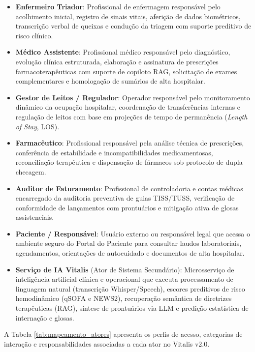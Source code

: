 \begin{itemize}[leftmargin=*]
    \item \textbf{Enfermeiro Triador}: Profissional de enfermagem responsável pelo acolhimento inicial, registro de sinais vitais, aferição de dados biométricos, transcrição verbal de queixas e condução da triagem com suporte preditivo de risco clínico.
    \item \textbf{Médico Assistente}: Profissional médico responsável pelo diagnóstico, evolução clínica estruturada, elaboração e assinatura de prescrições farmacoterapêuticas com suporte de copiloto RAG, solicitação de exames complementares e homologação de sumários de alta hospitalar.
    \item \textbf{Gestor de Leitos / Regulador}: Operador responsável pelo monitoramento dinâmico da ocupação hospitalar, coordenação de transferências internas e regulação de leitos com base em projeções de tempo de permanência (\textit{Length of Stay}, LOS).
    \item \textbf{Farmacêutico}: Profissional responsável pela análise técnica de prescrições, conferência de estabilidade e incompatibilidades medicamentosas, reconciliação terapêutica e dispensação de fármacos sob protocolo de dupla checagem.
    \item \textbf{Auditor de Faturamento}: Profissional de controladoria e contas médicas encarregado da auditoria preventiva de guias TISS/TUSS, verificação de conformidade de lançamentos com prontuários e mitigação ativa de glosas assistenciais.
    \item \textbf{Paciente / Responsável}: Usuário externo ou responsável legal que acessa o ambiente seguro do Portal do Paciente para consultar laudos laboratoriais, agendamentos, orientações de autocuidado e documentos de alta hospitalar.
    \item \textbf{Serviço de IA Vitalis} (Ator de Sistema Secundário): Microsserviço de inteligência artificial clínica e operacional que executa processamento de linguagem natural (transcrição Whisper/Speech), escores preditivos de risco hemodinâmico (qSOFA e NEWS2), recuperação semântica de diretrizes terapêuticas (RAG), síntese de prontuários via LLM e predição estatística de internação e glosas.
\end{itemize}

A Tabela \ref{tab:mapeamento_atores} apresenta os perfis de acesso, categorias de interação e responsabilidades associadas a cada ator no Vitalis v2.0.

